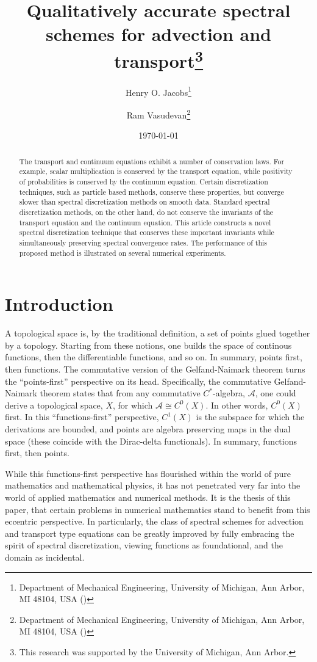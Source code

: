 \documentclass[final,leqno]{siamart}
\title{Qualitatively accurate spectral schemes for advection and transport\thanks{This research was supported by the University of Michigan, Ann Arbor.}}
\author{
    Henry O. Jacobs\thanks{Department of Mechanical Engineering, University of Michigan, Ann Arbor, MI 48104, USA (\email{hojacobs@umich.edu})}
    \and
    Ram Vasudevan\thanks{Department of Mechanical Engineering, University of Michigan, Ann Arbor, MI 48104, USA (\email{ramv@umich.edu}) }
}
\date{\today}
\begin{document}
\maketitle

\begin{abstract}
	The transport and continuum equations exhibit a number of conservation laws.
	For example, scalar multiplication is conserved by the transport equation, while
	positivity of probabilities is conserved by the continuum equation.
	Certain discretization techniques, such as particle based methods, conserve these properties, but converge slower than spectral discretization methods on smooth data.
	Standard spectral discretization methods, on the other hand, do not conserve the invariants of the transport equation and the continuum equation.
	This article constructs a novel spectral discretization technique that conserves these important invariants while simultaneously preserving spectral convergence rates. 
	The performance of this proposed method is illustrated on several numerical experiments. 
\end{abstract}

\section{Introduction}
\label{sec:intro}

A topological space is, by the traditional definition, a set of points glued together by a topology.
Starting from these notions, one builds the space of continous functions, then the differentiable functions, and so on.
In summary, points first, then functions.
The commutative version of the Gelfand-Naimark theorem turns the ``points-first'' perspective on its head.
Specifically, the commutative Gelfand-Naimark theorem states that from any commutative $C^*$-algebra, $\mathcal{A}$, one could derive a topological space, $X$, for which $\mathcal{A} \cong C^0(X)$.
In other words, $C^0(X)$ first.
In this ``functions-first'' perspective, $C^1(X)$ is the subspace for which the derivations are bounded, and points are algebra preserving maps in the dual space (these coincide with the Dirac-delta functionals).
In summary, functions first, then points.

While this functions-first perspective has flourished within the world of pure mathematics and mathematical physics, it has not penetrated very far into the world of applied mathematics and numerical methods.
It is the thesis of this paper, that certain problems in numerical mathematics stand to benefit from this eccentric perspective.
In particularly, the class of spectral schemes for advection and transport type equations can be greatly improved by fully embracing the spirit of spectral discretization, viewing functions as foundational, and the domain as incidental.
\end{document}
